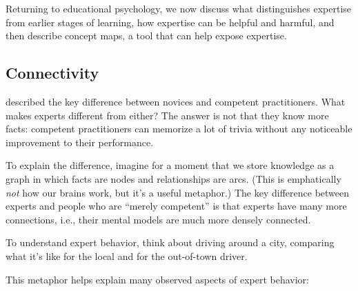 
Returning to educational psychology, we now discuss what distinguishes
expertise from earlier stages of learning, how expertise can be helpful
and harmful, and then describe concept maps, a tool that can help expose
expertise.

\subsection{Connectivity}\label{connectivity}

 described
the key difference between novices and competent practitioners. What
makes experts different from either? The answer is not that they know
more facts: competent practitioners can memorize a lot of trivia without
any noticeable improvement to their performance.

To explain the difference, imagine for a moment that we store knowledge
as a graph in which facts are nodes and relationships are arcs. (This is
emphatically \emph{not} how our brains work, but it's a useful
metaphor.) The key difference between experts and people who are
``merely competent'' is that experts have many more connections, i.e.,
their mental models are much more densely connected.

To understand expert behavior, think about driving around a city,
comparing what it's like for the local and for the out-of-town driver.

This metaphor helps explain many observed aspects of expert behavior:

